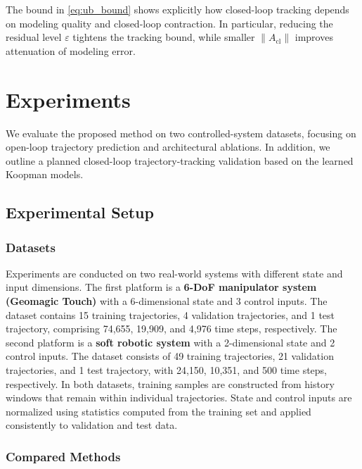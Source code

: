 \documentclass[journal]{IEEEtran}
\begin{document}
The bound in \eqref{eq:ub_bound} shows explicitly how closed-loop tracking depends on modeling quality and closed-loop contraction. In particular, reducing the residual level $\varepsilon$ tightens the tracking bound, while smaller $\|A_{\mathrm{cl}}\|$ improves attenuation of modeling error.

\section{Experiments}
\label{sec:experiments}

We evaluate the proposed method on two controlled-system datasets, focusing on open-loop trajectory prediction and architectural ablations. In addition, we outline a planned closed-loop trajectory-tracking validation based on the learned Koopman models.

\subsection{Experimental Setup}

\subsubsection{Datasets}

Experiments are conducted on two real-world systems with different state and input dimensions. The first platform is a \textbf{6-DoF manipulator system (Geomagic Touch)} with a 6-dimensional state and 3 control inputs. The dataset contains 15 training trajectories, 4 validation trajectories, and 1 test trajectory, comprising 74,655, 19,909, and 4,976 time steps, respectively. The second platform is a \textbf{soft robotic system} with a 2-dimensional state and 2 control inputs. The dataset consists of 49 training trajectories, 21 validation trajectories, and 1 test trajectory, with 24,150, 10,351, and 500 time steps, respectively. In both datasets, training samples are constructed from history windows that remain within individual trajectories. State and control inputs are normalized using statistics computed from the training set and applied consistently to validation and test data.

\subsubsection{Compared Methods}
\end{document}
